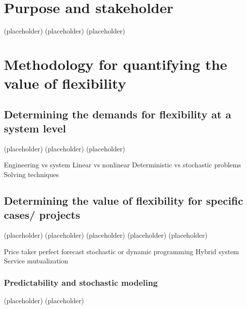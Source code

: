 \section{Purpose and stakeholder}

(placeholder)
\newpage
(placeholder)
\newpage
(placeholder)
\newpage

\section{Methodology for quantifying the value of flexibility}
\subsection{Determining the demands for flexibility at a system level}
(placeholder)
\newpage
(placeholder)
\newpage
(placeholder)
\newpage

Engineering vs system
Linear vs nonlinear
Deterministic vs stochastic problems
Solving techniques

\subsection{Determining the value of flexibility for specific cases/ projects}
(placeholder)
\newpage
(placeholder)
\newpage
(placeholder)
\newpage
(placeholder)
\newpage
(placeholder)
\newpage

Price taker
perfect forecast
stochastic or dynamic programming
Hybrid system
Service mutualization

\subsubsection{Predictability and stochastic modeling}
\label{sec:perfect-forecast}
\cite{He2011}
\cite{Sioshansi2009}
\cite{Bathurst2003}
\cite{Drury2011}
\cite{Connolly2012}
\cite{Alipour2017}
(placeholder)
\newpage
(placeholder)
\newpage

